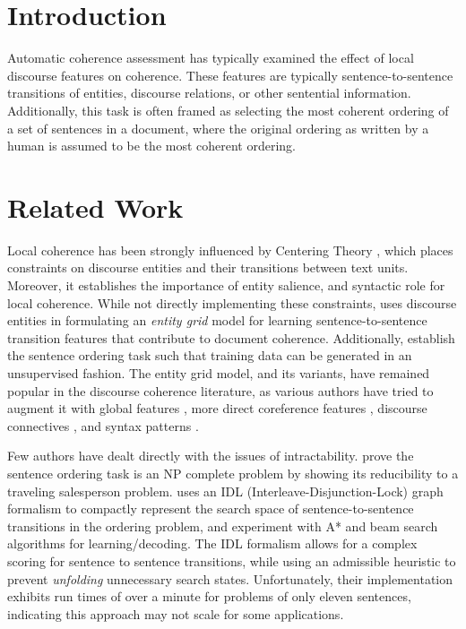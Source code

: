 \documentclass{article}
\begin{document}
\section{Introduction}


Automatic coherence assessment has typically examined the effect of local discourse features on coherence. These features are typically sentence-to-sentence transitions of entities, discourse relations, or other sentential information. 
Additionally, this task is often framed as selecting the most coherent ordering of a set of sentences in a document, where the original ordering as written by a human is assumed to be the most coherent ordering.


\section{Related Work}


Local coherence has been strongly influenced by Centering Theory \cite{grosz1995centering}, which places constraints on discourse entities and their transitions between text units.
Moreover, it establishes the importance of entity salience, and syntactic role for local coherence. 
While not directly implementing these constraints, \cite{barzilay2005modeling} uses discourse entities in formulating an \textit{entity grid} model for learning sentence-to-sentence transition features that contribute to document coherence. 
Additionally, \cite{barzilay2005modeling} establish the sentence ordering task such that training data can be generated in an unsupervised fashion.   
The entity grid model, and its variants, have remained popular in the discourse coherence literature, as various authors have tried to augment it with global features \cite{elsner2007unified}, more direct coreference features \cite{elsner2008coreference}, discourse connectives \cite{lin2011automatically}, and syntax patterns \cite{louis2012coherence}.  


Few authors have dealt directly with the issues of intractability. 
\cite{althaus2004computing} prove the sentence ordering task is an NP complete problem by showing its reducibility to a traveling salesperson problem. 
\cite{soricut2006discourse} uses an IDL (Interleave-Disjunction-Lock) graph formalism to compactly represent the search space of sentence-to-sentence transitions in the ordering problem, and experiment with A* and beam search algorithms for learning/decoding.                    
The IDL formalism allows for a complex scoring for sentence to sentence transitions, while using an admissible heuristic to prevent \textit{unfolding} unnecessary search states. 
Unfortunately, their implementation exhibits run times of over a minute for problems of only eleven sentences, indicating this approach may not scale for some applications.
\end{document}
